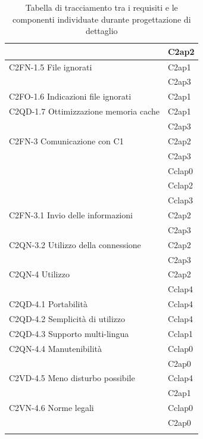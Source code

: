\begin{footnotesize}
\begin{longtable}[!h]{|l|l|}
&  C2ap2\\\hline  
C2FN-1.5 File ignorati &  C2ap1\\    
&  C2ap3  \\\hline
C2FO-1.6 Indicazioni file ignorati &  C2ap1\\\hline 
C2QD-1.7 Ottimizzazione memoria cache &  C2ap1\\
&  C2ap3\\\hline
C2FN-3 Comunicazione con C1 &  C2ap2\\
&  C2ap3\\
&  Cclap0\\
&  Cclap2\\
&  Cclap3\\\hline      
C2FN-3.1 Invio delle informazioni &  C2ap2\\
&  C2ap3\\\hline
C2QN-3.2 Utilizzo della connessione &  C2ap2\\
&  C2ap3\\\hline   
C2QN-4 Utilizzo &  C2ap2\\
&  Cclap4 \\\hline  
C2QD-4.1 Portabilit\`a &  Cclap4\\\hline   
C2QD-4.2 Semplicit\`a di utilizzo  &  Cclap4\\\hline  
C2QD-4.3 Supporto multi-lingua &  Cclap1\\\hline  
C2QN-4.4 Manutenibilit\`a &  Cclap0\\
&  C2ap0\\\hline 
C2VD-4.5 Meno disturbo possibile  &  Cclap4 \\
&  C2ap1 \\\hline                          
C2VN-4.6 Norme legali &  Cclap0\\
&  C2ap0\\\hline   
\caption{Tabella di tracciamento tra i requisiti e le componenti individuate
durante progettazione di dettaglio}
\end{longtable}
\end{footnotesize}

\newpage
